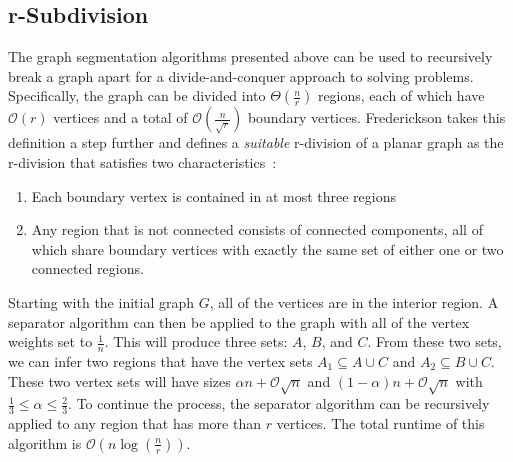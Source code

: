 \documentclass[12pt]{article}
\begin{document}
    \subsection{r-Subdivision}
    \label{sec:graph-sep-rsub}

    The graph segmentation algorithms presented above can be used to recursively break a graph apart for a divide-and-conquer approach to solving problems. Specifically, the graph can be divided into $\Theta \left (\frac{n}{r} \right )$ regions, each of which have $\mathcal{O}(r)$ vertices and a total of $\mathcal{O} \left (\frac{n}{\sqrt{r}} \right )$ boundary vertices. Frederickson takes this definition a step further and defines a \textit{suitable} r-division of a planar graph as the r-division that satisfies two characteristics~\cite{federickson1987fast}:
    \begin{enumerate}
        \item Each boundary vertex is contained in at most three regions

        \item Any region that is not connected consists of connected components, all of which share boundary vertices with exactly the same set of either one or two connected regions.
    \end{enumerate}

    Starting with the initial graph $G$, all of the vertices are in the interior region. A separator algorithm can then be applied to the graph with all of the vertex weights set to $\frac{1}{n}$. This will produce three sets: $A$, $B$, and $C$. From these two sets, we can infer two regions that have the vertex sets $A_1 \subseteq A \cup C$ and $A_2 \subseteq B \cup C$. These two vertex sets will have sizes $\alpha n + \mathcal{O}\sqrt{n}$ and $(1 - \alpha) n + \mathcal{O}\sqrt{n}$ with $\frac{1}{3} \leq \alpha \leq \frac{2}{3}$. To continue the process, the separator algorithm can be recursively applied to any region that has more than $r$ vertices. The total runtime of this algorithm is $\mathcal{O} \left (n \log \left (\frac{n}{r} \right ) \right )$.
\end{document}
